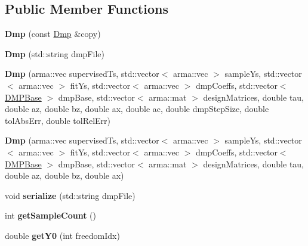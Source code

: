 \subsection*{Public Member Functions}
\begin{DoxyCompactItemize}
\item 
\hypertarget{classkukadu_1_1Dmp_a780c7d0ea48cc2dfaac10dbc8db9ecc6}{{\bfseries Dmp} (const \hyperlink{classkukadu_1_1Dmp}{Dmp} \&copy)}\label{classkukadu_1_1Dmp_a780c7d0ea48cc2dfaac10dbc8db9ecc6}

\item 
\hypertarget{classkukadu_1_1Dmp_a087cd38d5201e57f7404c6971bef1884}{{\bfseries Dmp} (std\-::string dmp\-File)}\label{classkukadu_1_1Dmp_a087cd38d5201e57f7404c6971bef1884}

\item 
\hypertarget{classkukadu_1_1Dmp_a0a490a4a7272808abd3f27ba40cb3ffd}{{\bfseries Dmp} (arma\-::vec supervised\-Ts, std\-::vector$<$ arma\-::vec $>$ sample\-Ys, std\-::vector$<$ arma\-::vec $>$ fit\-Ys, std\-::vector$<$ arma\-::vec $>$ dmp\-Coeffs, std\-::vector$<$ \hyperlink{classkukadu_1_1DMPBase}{D\-M\-P\-Base} $>$ dmp\-Base, std\-::vector$<$ arma\-::mat $>$ design\-Matrices, double tau, double az, double bz, double ax, double ac, double dmp\-Step\-Size, double tol\-Abs\-Err, double tol\-Rel\-Err)}\label{classkukadu_1_1Dmp_a0a490a4a7272808abd3f27ba40cb3ffd}

\item 
\hypertarget{classkukadu_1_1Dmp_a8b1adacb0928a62002005de708608621}{{\bfseries Dmp} (arma\-::vec supervised\-Ts, std\-::vector$<$ arma\-::vec $>$ sample\-Ys, std\-::vector$<$ arma\-::vec $>$ fit\-Ys, std\-::vector$<$ arma\-::vec $>$ dmp\-Coeffs, std\-::vector$<$ \hyperlink{classkukadu_1_1DMPBase}{D\-M\-P\-Base} $>$ dmp\-Base, std\-::vector$<$ arma\-::mat $>$ design\-Matrices, double tau, double az, double bz, double ax)}\label{classkukadu_1_1Dmp_a8b1adacb0928a62002005de708608621}

\item 
\hypertarget{classkukadu_1_1Dmp_a67645036f7e1dfb7ff833b8149716c2d}{void {\bfseries serialize} (std\-::string dmp\-File)}\label{classkukadu_1_1Dmp_a67645036f7e1dfb7ff833b8149716c2d}

\item 
\hypertarget{classkukadu_1_1Dmp_ab81d2e2b6f51744caff8714824afb940}{int {\bfseries get\-Sample\-Count} ()}\label{classkukadu_1_1Dmp_ab81d2e2b6f51744caff8714824afb940}

\item 
\hypertarget{classkukadu_1_1Dmp_ab5256cb887386b5fd48a88e60a14e1d6}{double {\bfseries get\-Y0} (int freedom\-Idx)}\label{classkukadu_1_1Dmp_ab5256cb887386b5fd48a88e60a14e1d6}


\end{DoxyCompactItemize}
